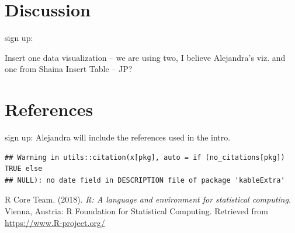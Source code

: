 \documentclass[man]{apa6}
\begin{document}
\section{Discussion}\label{discussion}

sign up:

Insert one data visualization -- we are using two, I believe Alejandra's
viz. and one from Shaina Insert Table -- JP?

\newpage

\section{References}\label{references}

sign up: Alejandra will include the references used in the intro.

\begin{verbatim}
## Warning in utils::citation(x[pkg], auto = if (no_citations[pkg]) TRUE else
## NULL): no date field in DESCRIPTION file of package 'kableExtra'
\end{verbatim}

\begingroup
\setlength{\parindent}{-0.5in} \setlength{\leftskip}{0.5in}

\hypertarget{refs}{}
\hypertarget{ref-R-base}{}
R Core Team. (2018). \emph{R: A language and environment for statistical
computing}. Vienna, Austria: R Foundation for Statistical Computing.
Retrieved from \url{https://www.R-project.org/}

\endgroup
\end{document}

